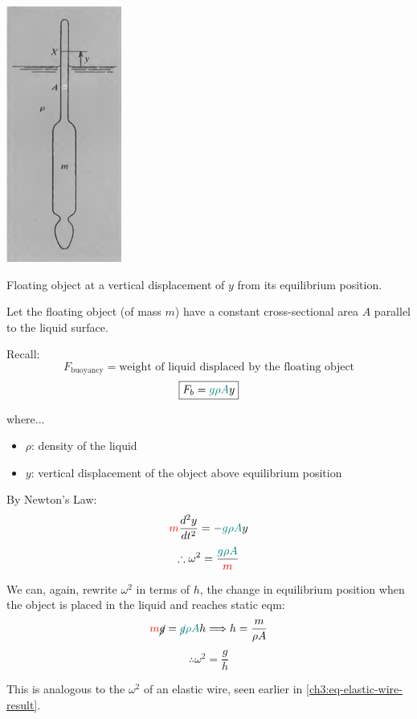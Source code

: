 \begin{marginfigure}
	\centering
	\includegraphics[scale=0.6]{phys232/Ch3-floating.png}
	\caption{Floating object at a vertical displacement of $y$ from its equilibrium position.}
	\label{ch3:fig-floating}
\end{marginfigure}

Let the floating object (of mass $m$) have a constant cross-sectional area $A$ parallel to the liquid surface.

Recall:
\[ F_\text{buoyancy} = \text{weight of liquid displaced by the floating object} \]
\[ \boxed{F_b  = \textcolor{teal}{g\rho A}y} \]

where...
\begin{itemize}
	\item $\rho$: density of the liquid
	\item $y$: vertical displacement of the object above equilibrium position
\end{itemize}


By Newton's Law:
\[ \textcolor{red}{m}\frac{d^2y}{dt^2} = -\textcolor{teal}{g\rho A}y \]
\[ \therefore \omega^2 = \frac{\textcolor{teal}{g\rho A}}{\textcolor{red}{m}} \]

We can, again, rewrite $\omega^2$ in terms of $h$, the change in equilibrium position when the object is placed in the liquid and reaches static eqm:
\[ \textcolor{red}{m}\cancel{g}=\textcolor{teal}{\cancel{g}\rho A} h
\Longrightarrow
h = \frac{m}{\rho A} \]
\[ \therefore \omega^2 = \frac{g}{h} \]


This is analogous to the $\omega^2$ of an elastic wire, seen earlier in \eqref{ch3:eq-elastic-wire-result}. 


